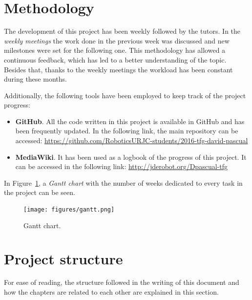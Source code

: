 \section{Methodology}
The development of this project has been weekly followed by the tutors. In the \emph{weekly meetings} the work done in the previous week was discussed and new milestones were set for the following one. This methodology has allowed a continuous feedback, which has led to a better understanding of the topic. Besides that, thanks to the weekly meetings the workload has been constant during these months. 

Additionally, the following tools have been employed to keep track of the project progress:
\begin{itemize}
	\item \textbf{GitHub}. All the code written in this project is available in GitHub and has been  frequently updated. In the following link, the main repository can be accessed:
	\url{https://github.com/RoboticsURJC-students/2016-tfg-david-pascual}
	\item \textbf{MediaWiki}. It has been used as a logbook of the progress of this project. It can be accessed in the following link:
	\url{http://jderobot.org/Dpascual-tfg}
\end{itemize}

In Figure~\ref{fig:gantt}, a \emph{Gantt chart} with the number of weeks dedicated to every task in the project can be seen.
\begin{figure}
	\centering
	\texttt{[image: figures/gantt.png]}
	\caption{Gantt chart.}
	\label{fig:gantt}
\end{figure}

\section{Project structure}
For ease of reading, the structure followed in the writing of this document and how the chapters are related to each other are explained in this section.

